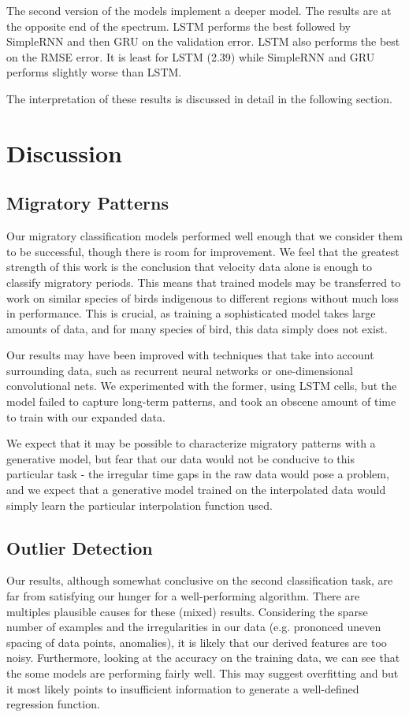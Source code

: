 \documentclass[letterpaper, 10pt, conference]{ieeeconf}  %
\begin{document}
The second version of the models implement a deeper model. The results are at the opposite end of the spectrum. LSTM performs the best followed by SimpleRNN and then GRU on the validation error. LSTM also performs the best on the RMSE error. It is least for LSTM (2.39) while SimpleRNN and GRU performs slightly worse than LSTM.

The interpretation of these results is discussed in detail in the following section. 

\section{Discussion} \label{discuss}
\subsection{Migratory Patterns}
	Our migratory classification models performed well enough that we consider them to be successful, though there is room for improvement. We feel that the greatest strength of this work is the conclusion that velocity data alone is enough to classify migratory periods. This means that trained models may be transferred to work on similar species of birds indigenous to different regions without much loss in performance. This is crucial, as training a sophisticated model takes large amounts of data, and for many species of bird, this data simply does not exist.
    
	Our results may have been improved with techniques that take into account surrounding data, such as recurrent neural networks or one-dimensional convolutional nets. We experimented with the former, using LSTM cells, but the model failed to capture long-term patterns, and took an obscene amount of time to train with our expanded data.
    
    We expect that it may be possible to characterize migratory patterns with a generative model, but fear that our data would not be conducive to this particular task - the irregular time gaps in the raw data would pose a problem, and we expect that a generative model trained on the interpolated data would simply learn the particular interpolation function used.

\subsection{Outlier Detection}
	Our results, although somewhat conclusive on the second classification task, are far from satisfying our hunger for a well-performing algorithm. There are multiples plausible causes for these (mixed) results. Considering the sparse number of examples and the irregularities in our data (e.g. prononced uneven spacing of data points, anomalies), it is likely that our derived features are too noisy. Furthermore, looking at the accuracy on the training data, we can see that the some models are performing fairly well. This may suggest overfitting and but it most likely points to insufficient information to generate a well-defined regression function.
\end{document}
